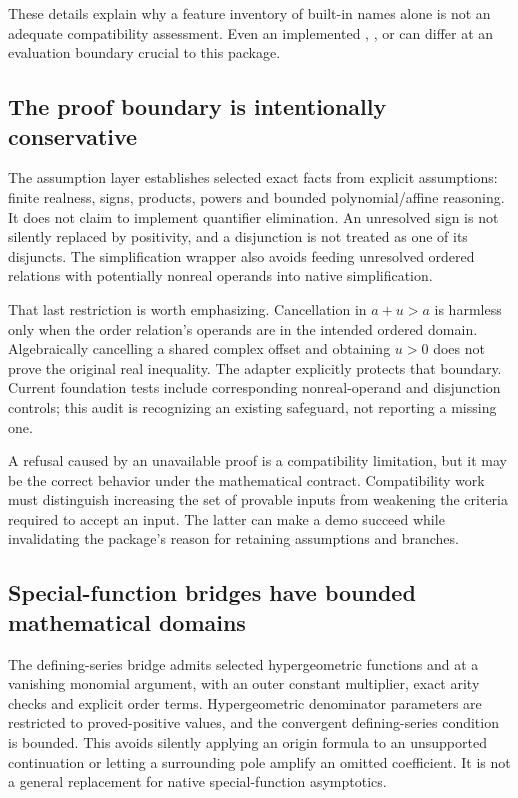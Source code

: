 \documentclass[11pt,letterpaper]{article}
\newcommand{\code}[1]{\texttt{\detokenize{#1}}}
\begin{document}
These details explain why a feature inventory of built-in names alone is not an adequate compatibility assessment. Even an implemented \code{Map}, \code{Sum}, \code{Module} or \code{Association} can differ at an evaluation boundary crucial to this package.

\subsection{The proof boundary is intentionally conservative}
The assumption layer establishes selected exact facts from explicit assumptions: finite realness, signs, products, powers and bounded polynomial/affine reasoning. It does not claim to implement quantifier elimination. An unresolved sign is not silently replaced by positivity, and a disjunction is not treated as one of its disjuncts. The simplification wrapper also avoids feeding unresolved ordered relations with potentially nonreal operands into native simplification.\cite{mathicsassumptions,mathicssimplify,mathicsbranches}

That last restriction is worth emphasizing. Cancellation in $a+u>a$ is harmless only when the order relation's operands are in the intended ordered domain. Algebraically cancelling a shared complex offset and obtaining $u>0$ does not prove the original real inequality. The adapter explicitly protects that boundary. Current foundation tests include corresponding nonreal-operand and disjunction controls; this audit is recognizing an existing safeguard, not reporting a missing one.\cite{mathicsdocs}

A refusal caused by an unavailable proof is a compatibility limitation, but it may be the correct behavior under the mathematical contract. Compatibility work must distinguish increasing the set of provable inputs from weakening the criteria required to accept an input. The latter can make a demo succeed while invalidating the package's reason for retaining assumptions and branches.

\subsection{Special-function bridges have bounded mathematical domains}
The defining-series bridge admits selected hypergeometric functions and \code{PolyLog} at a vanishing monomial argument, with an outer constant multiplier, exact arity checks and explicit order terms. Hypergeometric denominator parameters are restricted to proved-positive values, and the convergent defining-series condition is bounded. This avoids silently applying an origin formula to an unsupported continuation or letting a surrounding pole amplify an omitted coefficient. It is not a general replacement for native special-function asymptotics.\cite{mathicstaylor}
\end{document}
